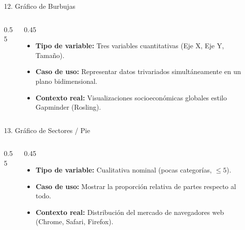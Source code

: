 \documentclass[aspectratio=169,10pt]{beamer}
\begin{document}
\begin{frame}{12. Gráfico de Burbujas}
\begin{columns}
\begin{column}{0.55\textwidth}
\end{column}
\begin{column}{0.45\textwidth}
\begin{itemize}\small
\item \textbf{Tipo de variable:} Tres variables cuantitativas (Eje X, Eje Y, Tamaño).
\item \textbf{Caso de uso:} Representar datos trivariados simultáneamente en un plano bidimensional.
\item \textbf{Contexto real:} Visualizaciones socioeconómicas globales estilo Gapminder (Rosling).
\end{itemize}
\end{column}
\end{columns}
\end{frame}

\begin{frame}{13. Gráfico de Sectores / Pie}
\begin{columns}
\begin{column}{0.55\textwidth}
\end{column}
\begin{column}{0.45\textwidth}
\begin{itemize}\small
\item \textbf{Tipo de variable:} Cualitativa nominal (pocas categorías, $\le 5$).
\item \textbf{Caso de uso:} Mostrar la proporción relativa de partes respecto al todo.
\item \textbf{Contexto real:} Distribución del mercado de navegadores web (Chrome, Safari, Firefox).
\end{itemize}
\end{column}
\end{columns}
\end{frame}
\end{document}
